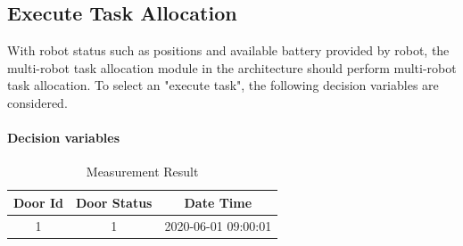 \subsection{Execute Task Allocation}
\label{sec:task_allocation}
With robot status such as positions and available battery provided by robot, the multi-robot task allocation module in the architecture should perform multi-robot task allocation. To select an "execute task", the following decision variables are considered.

\paragraph*{Decision variables}

\begin{table}[htb]
\centering
\begin{tabular}{|c| c| c|} 
\hline
Door Id & Door Status & Date Time \\
\hline
1& 1 & 2020-06-01 09:00:01 \\ [1ex] 
\hline
\end{tabular}
\caption{Measurement Result}
\label{tab:measurement_result}
\end{table}

\begin{table}[htb]
\centering
{}
\caption{Door Open Possibility}
\label{tab:open_possibilities}
\end{table}

